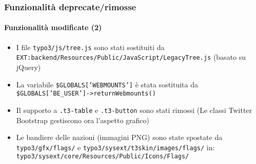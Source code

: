 \begin{frame}[fragile]
	\frametitle{Funzionalità deprecate/rimosse}
	\framesubtitle{Funzionalità modificate (2)}

	\begin{itemize}

		\item I file
			\small\texttt{typo3/js/tree.js}\normalsize\space
			sono stati sostituiti da
			\small\texttt{EXT:backend/Resources/Public/JavaScript/LegacyTree.js}\normalsize\newline
			(basato su jQuery)

		\item La variabile
			\small\texttt{\$GLOBALS['WEBMOUNTS']}\normalsize\space
			è stata sostituita da
			\small\texttt{\$GLOBALS['BE\_USER']->returnWebmounts()}\normalsize

		\item Il supporto a
			\small\texttt{.t3-table}\normalsize\space
			e
			\small\texttt{.t3-button}\normalsize\space
			sono stati rimossi\newline
			\small
				(Le classi Twitter Bootstrap gestiscono ora l'aspetto grafico)
			\normalsize

		\item Le bandiere delle nazioni (immagini PNG) sono state spostate da
			\small\texttt{typo3/gfx/flags/}\normalsize
			e
			\small\texttt{typo3/sysext/t3skin/images/flags/}\normalsize\newline
			in: \small\texttt{typo3/sysext/core/Resources/Public/Icons/Flags/}\normalsize

	\end{itemize}

\end{frame}


